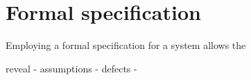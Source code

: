 \documentclass[Main]{subfiles}
\begin{document}
\section{Formal specification}

Employing a formal specification for a system allows the 

reveal
- assumptions
- defects
- 
\end{document}

